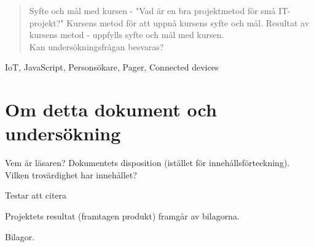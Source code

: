 
\begin{abstract}
Syfte och mål med kursen - "Vad är en bra projektmetod för små IT-projekt?" Kursens metod för att uppnå
kursens syfte och mål. Resultat av kursens metod - uppfylls syfte och mål med kursen.\\
Kan undersökningsfrågan besvaras?
\end{abstract}

\begin{IEEEkeywords}
IoT, JavaScript, Personsökare, Pager, Connected devices
\end{IEEEkeywords}

\section{Om detta dokument och undersökning}
Vem är läsaren? Dokumentets disposition (istället för innehållsförteckning). Vilken trovärdighet har innehållet?

Testar att citera \cite{eklund_arbeta_2010}

Projektets resultat (framtagen produkt) framgår av bilagorna.

Bilagor.